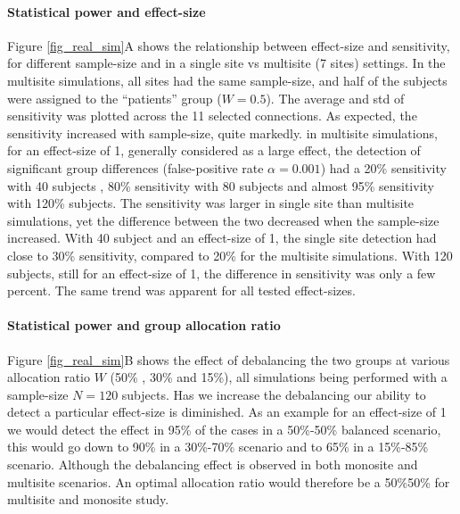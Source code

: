 \documentclass[authoryear]{elsarticle}
\begin{document}
\paragraph{Statistical power and effect-size} Figure \ref{fig_real_sim}A shows the relationship between effect-size and sensitivity, for different sample-size and in a single site vs multisite (7 sites) settings. In the multisite simulations, all sites had the same sample-size, and half of the subjects were assigned to the ``patients'' group ($W=0.5$). The average and std of sensitivity was plotted across the 11 selected connections. As expected, the sensitivity increased with sample-size, quite markedly. in multisite simulations, for an effect-size of 1, generally considered as a large effect, the detection of significant group differences (false-positive rate $\alpha=0.001$) had a 20\% sensitivity with 40 subjects , 80\% sensitivity with 80 subjects and almost 95\% sensitivity with 120\% subjects. The sensitivity was larger in single site than multisite simulations, yet the difference between the two decreased when the sample-size increased. With 40 subject and an effect-size of 1, the single site detection had close to 30\% sensitivity, compared to 20\% for the multisite simulations. With 120 subjects, still for an effect-size of 1, the difference in sensitivity was only a few percent. The same trend was apparent for all tested effect-sizes. 

\paragraph{Statistical power and group allocation ratio} Figure \ref{fig_real_sim}B shows the effect of debalancing the two groups at various allocation ratio $W$ (50\% , 30\% and 15\%), all simulations being performed with a sample-size $N=120$  subjects. Has we increase the debalancing our ability to detect a particular effect-size is diminished. As an example for an effect-size of 1 we would detect the effect in 95\% of the cases in a 50\%-50\% balanced scenario, this would go down to 90\% in a 30\%-70\% scenario and to 65\% in a 15\%-85\% scenario. Although the debalancing effect  is observed in both monosite and multisite scenarios. An optimal allocation ratio would therefore be a 50\%50\% for multisite and monosite study.
\end{document}
